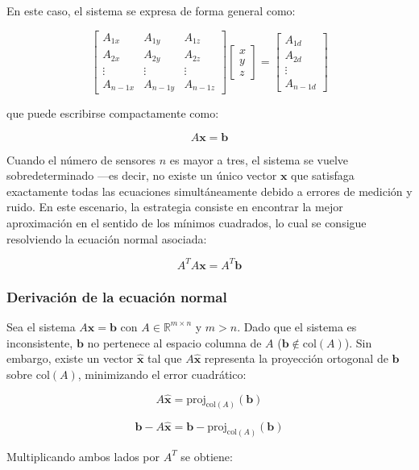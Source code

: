 En este caso, el sistema se expresa de forma general como:

\[
\begin{bmatrix}
A_{1x} & A_{1y} & A_{1z}\\
A_{2x} & A_{2y} & A_{2z}\\
\vdots & \vdots & \vdots\\
A_{n-1x} & A_{n-1y} & A_{n-1z}
\end{bmatrix}
\begin{bmatrix}
x \\ y \\ z
\end{bmatrix}
=
\begin{bmatrix}
A_{1d}\\
A_{2d}\\
\vdots\\
A_{n-1d}
\end{bmatrix}
\]

que puede escribirse compactamente como:

\[
A \mathbf{x} = \mathbf{b}
\]

Cuando el número de sensores $n$ es mayor a tres, el sistema se vuelve sobredeterminado —es decir, no existe un único vector $\mathbf{x}$ que satisfaga exactamente todas las ecuaciones simultáneamente debido a errores de medición y ruido. En este escenario, la estrategia consiste en encontrar la mejor aproximación en el sentido de los mínimos cuadrados, lo cual se consigue resolviendo la ecuación normal asociada:

\[
A^T A \mathbf{x} = A^T \mathbf{b}
\]

\subsubsection*{Derivación de la ecuación normal}

Sea el sistema $A\mathbf{x} = \mathbf{b}$ con $A \in \mathbb{R}^{m \times n}$ y $m > n$. Dado que el sistema es inconsistente, $\mathbf{b}$ no pertenece al espacio columna de $A$ ($\mathbf{b} \notin \text{col}(A)$). Sin embargo, existe un vector $\hat{\mathbf{x}}$ tal que $A\hat{\mathbf{x}}$ representa la proyección ortogonal de $\mathbf{b}$ sobre $\text{col}(A)$, minimizando el error cuadrático:

\[
A\hat{\mathbf{x}} = \text{proj}_{\text{col}(A)}(\mathbf{b})
\]

\[
\mathbf{b} - A\hat{\mathbf{x}} = \mathbf{b} - \text{proj}_{\text{col}(A)}(\mathbf{b})
\]

Multiplicando ambos lados por $A^T$ se obtiene:

